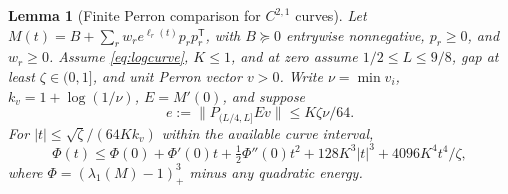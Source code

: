 \documentclass[11pt]{amsart}
\newtheorem{lemma}[theorem]{Lemma}
\theoremstyle{remark}\newtheorem{remark}[theorem]{Remark}
\newcommand{\T}{\mathsf T}
\begin{document}
\begin{lemma}[Finite Perron comparison for $C^{2,1}$ curves]\label{lem:perron}
Let $M(t)=B+\sum_r w_re^{\ell_r(t)}p_rp_r^\T$, with $B\succeq0$
entrywise nonnegative, $p_r\ge0$, and $w_r\ge0$.
Assume \eqref{eq:logcurve}, $K\le1$, and at zero assume
$1/2\le L\le9/8$, gap at least $\zeta\in(0,1]$, and unit Perron vector
$v>0$. Write $\nu=\min v_i$, $k_v=1+\log(1/\nu)$,
$E=M'(0)$, and suppose
\[
 e:=\|P_{(L/4,L]}Ev\|\le K\zeta\nu/64.
\]
For $|t|\le\sqrt\zeta/(64Kk_v)$ within the available curve interval,
\begin{equation}\label{eq:remainder}
 \Phi(t)\le\Phi(0)+\Phi'(0)t+\tfrac12\Phi''(0)t^2
             +128K^3|t|^3+4096K^4t^4/\zeta,
\end{equation}
where $\Phi=(\lambda_1(M)-1)_+^3$ minus any quadratic energy.
\end{lemma}
\end{document}
